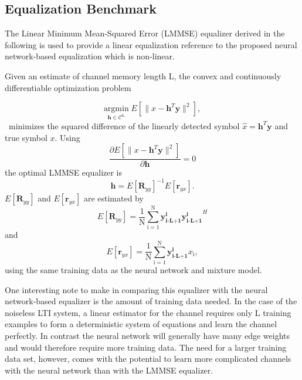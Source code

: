 \subsection{Equalization Benchmark}
The Linear Minimum Mean-Squared Error (LMMSE) equalizer derived in the following is used to provide a linear equalization reference to the proposed neural network-based equalization which is non-linear.
\par
Given an estimate of channel memory length L, the convex and continuously differentiable optimization problem 

\begin{equation*}\label{mmse}
\underset{\mathbf{\mathbf{h}} \in \textit{$\mathcal{C}^{\text{L}}$}}{\text{argmin}} \;
 E[\|x-\mathbf{h}^T\mathbf{y}\|^2],
\end{equation*}\
minimizes the squared difference of the linearly detected symbol $\hat{x}= \mathbf{h}^T\mathbf{y}$ and true symbol $x$.
Using
\begin{equation*}\label{mmse}
\frac{\partial  E[\|x-\mathbf{h}^T\mathbf{y}\|^2]}{\partial \mathbf{h} } = 0
\end{equation*}
the optimal LMMSE equalizer is \cite{proakis1988introduction}
\begin{equation*}\label{mmse}
\mathbf{h} = E[\mathbf{R}_{yy}]^{-1}E[\mathbf{r}_{yx}].
\end{equation*}
$E[\mathbf{R}_{yy}]$ and $E[\mathbf{r}_{yx}]$ are estimated by
\begin{equation*}\label{mmse}
 E[\mathbf{R}_{yy}]= \frac{1}{\mathrm{N}}\sum_{\mathrm{i=1}}^{\mathrm{N}}
\mathbf{y^{\text{i}}_{\text{i-L+1}}}\mathbf{y^{\text{i}}_{\text{i-L+1}}}^H
 \end{equation*}
 and
\begin{equation*}\label{mmse}
E[\mathbf{r}_{yx}]= \frac{1}{\mathrm{N}}\sum_{\mathrm{i=1}}^{\mathrm{N}}
\mathbf{y^{\text{i}}_{\text{i-L+1}}}x_{\text{i}},
 \end{equation*}
 using the same training data as the neural network and mixture model. 
 
\par
One interesting note to make in comparing this equalizer with the neural network-based equalizer is the amount of training data needed. In the case of the noiseless LTI system, a linear estimator for the channel requires only L training examples to form a deterministic system of equations and learn the channel perfectly. In contrast the neural network will generally have many edge weights and would therefore require more training data. The need for a larger training data set, however, comes with the potential to learn more complicated channels with the neural network than with the LMMSE equalizer.
 
